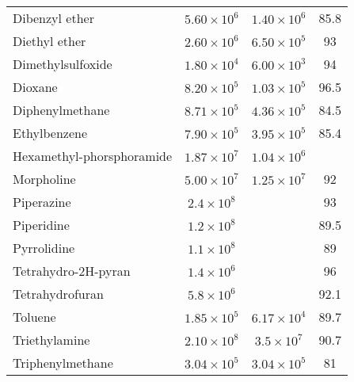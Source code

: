 \begin{longtable}{m{3.1cm} | c c c}
 Dibenzyl ether                 & $ 5.60 \times 10^6$ & $1.40 \times 10^6 $ &      85.8 \\
 Diethyl ether                  & $ 2.60 \times 10^6$ & $6.50 \times 10^5 $ &        93 \\
 Dimethylsulfoxide              & $ 1.80 \times 10^4$ & $6.00 \times 10^3 $ &        94 \\
 Dioxane                        & $ 8.20 \times 10^5$ & $1.03 \times 10^5 $ &      96.5 \\
 Diphenylmethane                & $ 8.71 \times 10^5$ & $4.36 \times 10^5 $ &      84.5 \\
 Ethylbenzene                   & $ 7.90 \times 10^5$ & $3.95 \times 10^5 $ &      85.4 \\
 Hexamethyl-phorsphoramide       & $ 1.87 \times 10^7$ & $1.04 \times 10^6 $ &           \\
 Morpholine                     & $ 5.00 \times 10^7$ & $1.25 \times 10^7 $ &        92 \\
 Piperazine                     & $ 2.4 \times 10^8 $ &                &        93 \\
 Piperidine                     & $ 1.2 \times 10^8 $ &                &      89.5 \\
 Pyrrolidine                    & $ 1.1 \times 10^8 $ &                &        89 \\
 Tetrahydro-2H-pyran            & $ 1.4 \times 10^6 $ &                &        96 \\
 Tetrahydrofuran                & $ 5.8 \times 10^6 $ &                &      92.1 \\
 Toluene                        & $ 1.85 \times 10^5$ & $6.17 \times 10^4 $ &      89.7 \\
 Triethylamine                  & $ 2.10 \times 10^8$ & $3.5 \times 10^7  $ &      90.7 \\
 Triphenylmethane               & $ 3.04 \times 10^5$ & $3.04 \times 10^5 $ &        81 \\
\end{longtable}
